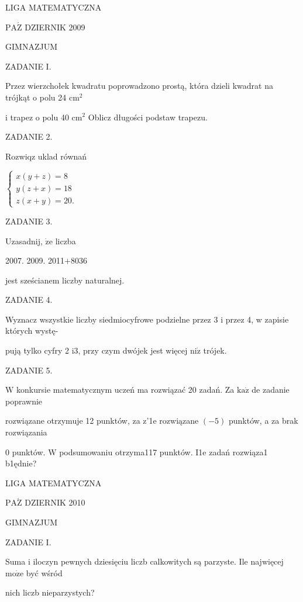 \documentclass[a4paper,12pt]{article}
\begin{document}
LIGA MATEMATYCZNA

$\mathrm{P}\mathrm{A}\acute{\mathrm{Z}}$ DZIERNIK 2009

GIMNAZJUM

ZADANIE I.

Przez wierzchołek kwadratu poprowadzono prostą, która dzieli kwadrat na trójkąt o polu 24 $\mathrm{c}\mathrm{m}^{2}$

i trapez o polu 40 $\mathrm{c}\mathrm{m}^{2}$ Oblicz długości podstaw trapezu.

ZADANIE 2.

Rozwiqz uklad równań

$\left\{\begin{array}{l}
x(y+z)=8\\
y(z+x)=18\\
z(x+y)=20.
\end{array}\right.$

ZADANIE 3.

Uzasadnij, $\dot{\mathrm{z}}\mathrm{e}$ liczba

2007. 2009. 2011$+$8036

jest sześcianem liczby naturalnej.

ZADANIE 4.

Wyznacz wszystkie liczby siedmiocyfrowe podzielne przez 3 i przez 4, w zapisie których wystę-

pują tylko cyfry 2 $\mathrm{i}3$, przy czym dwójek jest więcej $\mathrm{n}\mathrm{i}\dot{\mathrm{z}}$ trójek.

ZADANIE 5.

$\mathrm{W}$ konkursie matematycznym uczeń ma rozwiązać 20 zadań. Za $\mathrm{k}\mathrm{a}\dot{\mathrm{z}}$ de zadanie poprawnie

rozwiązane otrzymuje 12 punktów, za z'1e rozwiązane $(-5)$ punktów, a za brak rozwiązania

0 punktów. $\mathrm{W}$ podsumowaniu otrzyma117 punktów. I1e zadań rozwiąza1 b1ędnie?





LIGA MATEMATYCZNA

$\mathrm{P}\mathrm{A}\acute{\mathrm{Z}}$ DZIERNIK 2010

GIMNAZJUM

ZADANIE I.

Suma i iloczyn pewnych dziesięciu liczb calkowitych są parzyste. Ile najwięcej $\mathrm{m}\mathrm{o}\dot{\mathrm{z}}\mathrm{e}$ być wśród

nich liczb nieparzystych?
\end{document}
